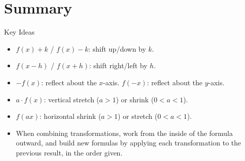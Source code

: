\documentclass[12pt]{article}
\begin{document}
  

\section*{Summary}

\begin{friendlyrule}{Key Ideas}
\begin{itemize}
    \item $f(x)+k$ / $f(x)-k$: shift up/down by $k$.
    \item $f(x-h)$ / $f(x+h)$: shift right/left by $h$.
    \item $-f(x)$: reflect about the $x$-axis. $f(-x)$: reflect about the $y$-axis.
    \item $a\cdot f(x)$: vertical stretch ($a>1$) or shrink ($0<a<1$).
    \item $f(ax)$: horizontal shrink ($a>1$) or stretch ($0<a<1$).
    \item When combining transformations, work from the inside of the formula outward, and build new formulas by applying each transformation to the previous result, in the order given.
\end{itemize}
\end{friendlyrule}
\end{document}
